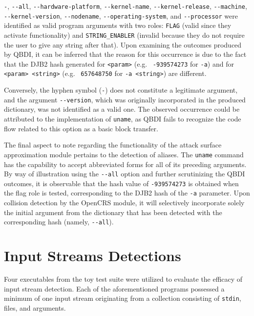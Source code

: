 \documentclass[../main.tex]{subfiles}
\begin{document}
\texttt{-}, \texttt{-\/-all}, \texttt{-\/-hardware-platform},
\texttt{-\/-kernel-name}, \texttt{-\/-kernel-release}, \texttt{-\/-machine}, \\ \texttt{-\/-kernel-version},
\texttt{-\/-nodename}, \texttt{-\/-operating-system}, and
\texttt{-\/-processor} were identified as valid program arguments with
two roles: \texttt{FLAG} (valid since they activate functionality) and
\texttt{STRING\_ENABLER} (invalid because they do not require the user
to give any string after that). Upon examining the outcomes produced by
QBDI, it can be inferred that the reason for this occurrence is due to
the fact that the DJB2 hash generated for \texttt{<param>}
(e.g. ~\texttt{-939574273} for \texttt{-a}) and for
\texttt{<param>\ \textless{}string\textgreater{}} (e.g. ~\texttt{657648750} for \texttt{-a <string>})
are different.

Conversely, the hyphen symbol (\texttt{-}) does not constitute a legitimate
argument, and the argument \texttt{-\/-version}, which was originally
incorporated in the produced dictionary, was not identified as a valid one. The
observed occurrence could be attributed to the implementation of
\texttt{uname}, as QBDI fails to recognize the code flow related to this option
as a basic block transfer.

The final aspect to note regarding the functionality of the attack surface
approximation module pertains to the detection of aliases. The \texttt{uname}
command has the capability to accept abbreviated forms for all of its preceding
arguments. By way of illustration using the \texttt{-\/-all} option and further
scrutinizing the QBDI outcomes, it is observable that the hash value of
\texttt{-939574273} is obtained when the flag role is tested, corresponding to
the DJB2 hash of the \texttt{-a} parameter. Upon collision detection by the
OpenCRS module, it will selectively incorporate solely the initial argument
from the dictionary that has been detected with the corresponding hash (namely,
\texttt{-\/-all}).

\hypertarget{input-streams-detections}{%
  \section{Input Streams Detections}\label{input-streams-detections}}

Four executables from the toy test suite were utilized to evaluate the efficacy
of input stream detection. Each of the aforementioned programs possessed a
minimum of one input stream originating from a collection consisting of
\texttt{stdin}, files, and arguments.
\end{document}
